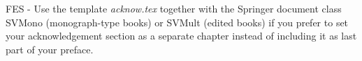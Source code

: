 %
%


FES - Use the template \emph{acknow.tex} together with the Springer document class SVMono (monograph-type books) or SVMult (edited books) if you prefer to set your acknowledgement section as a separate chapter instead of including it as last part of your preface.

